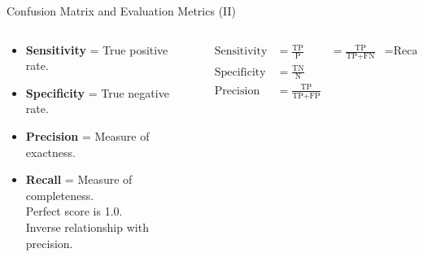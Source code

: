 \begin{frame}{Confusion Matrix and Evaluation Metrics (II)}
	
	\begin{columns}
		\begin{column}{0.4\textwidth}
			\begin{itemize}
				\item \textbf{Sensitivity} = True positive rate.
				\item \textbf{Specificity} = True negative rate.
				\item \textbf{Precision} = Measure of exactness.
				\item \textbf{Recall} = Measure of completeness.\\
				      Perfect score is 1.0.\\
				      Inverse relationship with precision.
			\end{itemize}
		\end{column}

		\begin{column}{0.6\textwidth}
			\begin{align*}
				\text{Sensitivity} & = \frac{\text{TP}}{\text{P}}              & = \frac{\text{TP}}{\text{TP} + \text{FN}} & = \text{Recall} \\
				\text{Specificity} & = \frac{\text{TN}}{\text{N}}                                                                            \\
				\text{Precision}   & = \frac{\text{TP}}{\text{TP} + \text{FP}}
			\end{align*}
		\end{column}
	\end{columns}
\end{frame}

